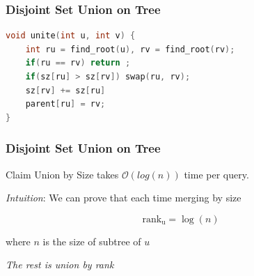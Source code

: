 \begin{frame}[fragile]
\frametitle{Disjoint Set Union on Tree}

\begin{lstlisting}[language=C++, basicstyle=\small]
void unite(int u, int v) {
    int ru = find_root(u), rv = find_root(rv);
    if(ru == rv) return ;
    if(sz[ru] > sz[rv]) swap(ru, rv);
    sz[rv] += sz[ru]
    parent[ru] = rv;
}
\end{lstlisting}

\end{frame}

\begin{frame}
\frametitle{Disjoint Set Union on Tree}
\begin{block}{Claim}
Union by Size takes $\mathcal{O}(log(n))$ time per query.
\end{block}
\textit{Intuition}: 
We can prove that each time merging by size

\[
    \mathrm{rank_{u}} = \log(n)
\]

where $n$ is the size of subtree of $u$

\textit{The rest is union by rank}
\end{frame}